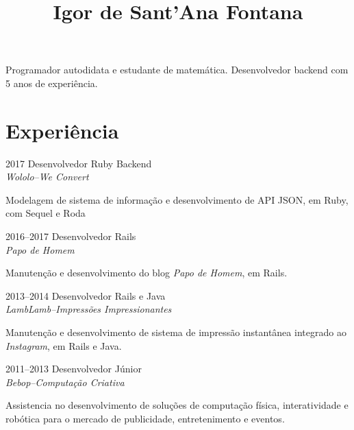 \documentclass[a4paper,twoside]{simplecv}
\begin{document}


\title{Igor de Sant'Ana Fontana}

\maketitle

Programador autodidata e estudante de matemática. Desenvolvedor backend com 5
anos de experiência.

\section{Experiência}

\begin{topic}
\item[2017] Desenvolvedor Ruby Backend\\
	{\em\small Wololo--We Convert}

	Modelagem de sistema de informação e desenvolvimento de API JSON, em
	Ruby, com Sequel e Roda

\item[2016--2017] Desenvolvedor Rails\\
	{\em\small Papo de Homem}

	Manutenção e desenvolvimento do blog \emph{Papo de Homem}, em Rails.

\item[2013--2014] Desenvolvedor Rails e Java\\
	{\em\small LambLamb--Impressões Impressionantes}

	Manutenção e desenvolvimento de sistema de impressão instantânea
	integrado ao \emph{Instagram}, em Rails e Java.

\item[2011--2013] Desenvolvedor Júnior\\
	{\em\small Bebop--Computação Criativa}

	Assistencia no desenvolvimento de soluções de computação física,
	interatividade e robótica para o mercado de publicidade, entretenimento
	e eventos.
\end{topic}
\end{document}

